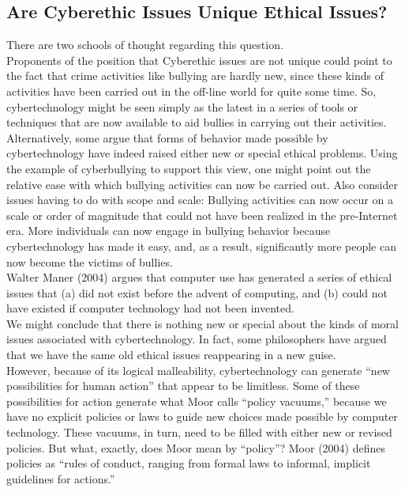 \documentclass[12pt]{article}
\theoremstyle{definition}
\begin{document}
\subsection{Are Cyberethic Issues Unique Ethical Issues?}
There are two schools of thought regarding this question.\\
Proponents of the position that Cyberethic issues are not unique could point to the fact that crime activities like bullying are hardly new, since these kinds of activities have been carried out in the off-line world for quite some time. So, cybertechnology might be seen simply as the latest in a series of tools or techniques that are now available to aid bullies in carrying out their activities.\\
Alternatively, some argue that forms of behavior made possible by cybertechnology have indeed raised either new or special ethical problems. Using the example of cyberbullying to support this view, one might point out the relative ease with which bullying activities can now be carried out. Also consider issues having to do with scope and scale: Bullying activities can now occur on a scale or order of magnitude that could not have been realized in the pre-Internet era. More individuals can now engage in bullying behavior because cybertechnology has made it easy, and, as a result, significantly more people can now become the victims of bullies.\\
Walter Maner (2004) argues that computer use has generated a series of ethical issues that (a) did not exist before the advent of computing, and (b) could not have existed if computer technology had not been invented.\\
We might conclude that there is nothing new or special about the kinds of moral issues associated with cybertechnology. In fact, some philosophers have argued that we have the same old ethical issues reappearing in a new guise.\\
However, because of its logical malleability, cybertechnology can generate “new possibilities for human action” that appear to be limitless. Some of these possibilities for action generate what Moor calls “policy vacuums,” because we have no explicit policies or laws to guide new choices made possible by computer technology. These vacuums, in turn, need to be filled with either new or revised policies. But what, exactly, does Moor mean by “policy”? Moor (2004) defines policies as “rules of conduct, ranging from formal laws to informal, implicit guidelines for actions.”\\
\end{document}
